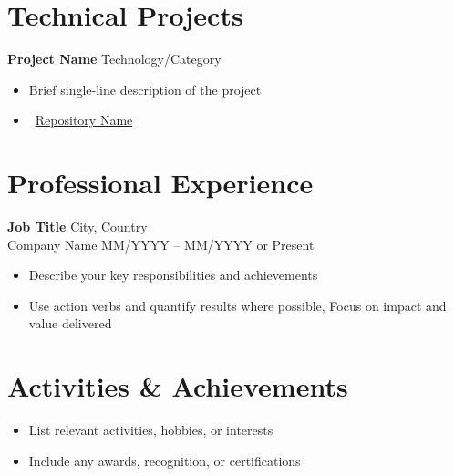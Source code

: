 \documentclass[a4paper,11pt]{article}
\newcommand{\runsubsection}[1]{\textcolor{mainblue}{\bfseries #1}\normalfont}
\newcommand{\location}[1]{\textcolor{maingray}{\small #1}}
\newcommand{\githublink}[2]{\faGithub\ \href{https://github.com/#1}{#2}}
\begin{document}
\section*{Technical Projects}
\runsubsection{Project Name} \hfill \location{Technology/Category}
\begin{itemize}
    \item Brief single-line description of the project
    \item \githublink{yourusername/repository-name}{Repository Name}
\end{itemize}

\section*{Professional Experience}
\runsubsection{Job Title} \hfill \location{City, Country}\\[2pt]
Company Name \hfill \location{MM/YYYY -- MM/YYYY or Present}
\begin{itemize}
    \item Describe your key responsibilities and achievements
    \item Use action verbs and quantify results where possible, Focus on impact and value delivered
\end{itemize}

\section*{Activities \& Achievements}
\begin{itemize}
    \item List relevant activities, hobbies, or interests
    \item Include any awards, recognition, or certifications
\end{itemize}
\end{document}

